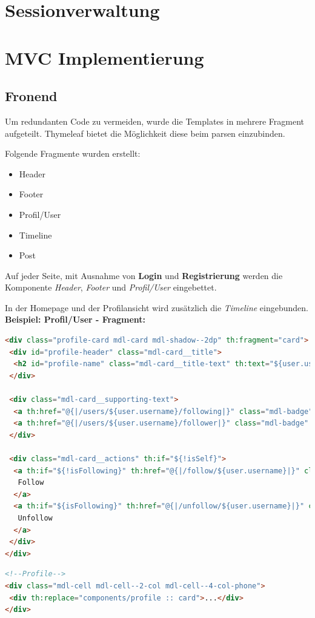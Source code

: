 \documentclass[
    a4paper
]{scrreprt}
\begin{document}
    \section{Sessionverwaltung}

    \section{MVC Implementierung}
    \subsection{Fronend}
	Um redundanten Code zu vermeiden, wurde die Templates in mehrere Fragment aufgeteilt. Thymeleaf bietet die Möglichkeit diese beim parsen einzubinden.
	
	Folgende Fragmente wurden erstellt:
	\begin{itemize} 
		\item Header
		\item Footer
		\item Profil/User
		\item Timeline
		\item Post
	\end{itemize}

	Auf jeder Seite, mit Ausnahme von \textbf{Login} und \textbf{Registrierung} werden die Komponente \textit{Header}, \textit{Footer} und \textit{Profil/User} eingebettet.
	
	In der Homepage und der Profilansicht wird zusätzlich die \textit{Timeline} eingebunden.\\
	
	\textbf{Beispiel: Profil/User - Fragment:}
	\begin{lstlisting}[language=html]
<div class="profile-card mdl-card mdl-shadow--2dp" th:fragment="card">
 <div id="profile-header" class="mdl-card__title">
  <h2 id="profile-name" class="mdl-card__title-text" th:text="${user.username}"></h2>
 </div>
		
 <div class="mdl-card__supporting-text">
  <a th:href="@{|/users/${user.username}/following|}" class="mdl-badge" th:attr="data-badge=${followingCnt}">Following</a>
  <a th:href="@{|/users/${user.username}/follower|}" class="mdl-badge" th:attr="data-badge=${followerCnt}">Follower</a>
 </div>
		
 <div class="mdl-card__actions" th:if="${!isSelf}">
  <a th:if="${!isFollowing}" th:href="@{|/follow/${user.username}|}" class="mdl-button mdl-button--raised mdl-button--colored mdl-js-button mdl-js-ripple-effect" style="width: 100%;">
   Follow
  </a>
  <a th:if="${isFollowing}" th:href="@{|/unfollow/${user.username}|}" class="warn mdl-button mdl-button--raised mdl-js-button mdl-js-ripple-effect" style="width: 100%;">
   Unfollow
  </a>
 </div>
</div>
	\end{lstlisting}
	\begin{lstlisting}[language=html]
<!--Profile-->
<div class="mdl-cell mdl-cell--2-col mdl-cell--4-col-phone">
 <div th:replace="components/profile :: card">...</div>
</div>
	\end{lstlisting}
\end{document}
